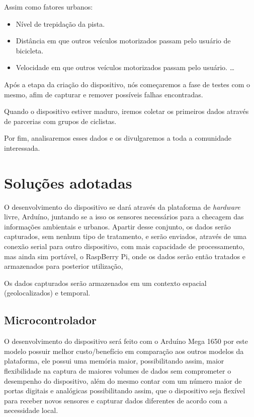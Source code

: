 \documentclass[final,12pt, times, 5p, twocolumn]{elsarticle}
\begin{document}
Assim como fatores urbanos:

\begin{itemize}

  \item Nível de trepidação da pista.
  \item Distância em que outros veículos motorizados passam pelo usuário de bicicleta.
  \item Velocidade em que outros veículos motorizados passam pelo usuário. \ldots

\end{itemize}

Após a etapa da criação do dispositivo, nós começaremos a fase de testes com o mesmo, afim de capturar e remover possíveis falhas encontradas.

Quando o dispositivo estiver maduro, iremos coletar os primeiros dados através de parcerias com grupos de ciclistas.

Por fim, analisaremos esses dados e os divulgaremos a toda a comunidade interessada.

\section{Soluções adotadas}

O desenvolvimento do dispositivo se dará através da plataforma  de \textit{hardware} livre, Arduíno, juntando se a isso os sensores necessários para a checagem das informações ambientais e urbanos. Apartir desse conjunto, os dados serão capturados, sem nenhum tipo de tratamento, e serão enviados, através de uma conexão serial\cite{Conexão Serial} para outro dispositivo, com mais capacidade de processamento, mas ainda sim portável, o RaspBerry Pi\cite{Raspberry Pi}, onde os dados serão então tratados e armazenados para posterior utilização, 

Os dados capturados serão armazenados em um contexto espacial (geolocalizados) e temporal.

\subsection{Microcontrolador}
O desenvolvimento do dispositivo será feito com o Arduíno Mega 1650 por este modelo possuir melhor custo/benefício em comparação aos outros modelos da plataforma, ele possui uma memória maior, possibilitando assim, maior flexibilidade na captura de maiores volumes de dados sem comprometer o desempenho do dispositivo, além do mesmo contar com um número maior de portas digitais e analógicas possibilitando assim, que o dispositivo seja flexível para receber novos sensores e capturar dados diferentes de acordo com a necessidade local.
\end{document}
